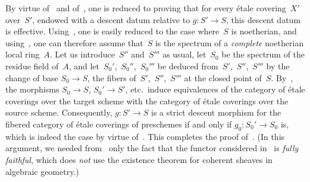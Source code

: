 By virtue of~ and of~, one is reduced to
proving that for every \'etale covering~$X'$ over~$S'$, endowed
with a descent datum relative to $g\colon S'\to S$,
this descent datum is effective. Using~,
one is easily reduced
to the case where~$S$ is noetherian, and using~, one
can therefore assume that~$S$ is the spectrum of a
\emph{complete} noetherian local ring~$A$. Let us introduce~$S''$ and~$S'''$ as
usual, let~$S_0$ be the spectrum of the residue field of~$A$, and
let~$S_0'$,~$S_0''$,~$S_0'''$ be deduced from~$S'$,~$S''$,~$S'''$
by the change of base $S_0\to S$, \ie the fibers
of~$S'$,~$S''$,~$S'''$ at the closed point of~$S$.
By~, the morphisms $S_0\to S$, $S_0'\to S'$,
etc.\ induce equivalences of the category of
\'etale coverings over the target scheme with the category
of \'etale coverings over the source scheme. Consequently,
$g\colon S'\to S$ is a strict descent morphism for the
fibered category of \'etale coverings of
preschemes if and only if $g_0\colon S_0'\to S_0$ is,
which is indeed the case by virtue of~. This completes the
proof of~. (In this argument, we needed
from~ only the fact that the functor considered
in~ is \emph{fully faithful}, which does \emph{not} use
the existence theorem for coherent sheaves
in algebraic geometry.)

